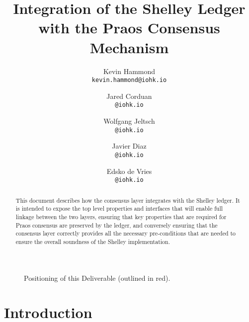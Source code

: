 \documentclass[11pt,a4paper,dvipsnames,twosided,final]{article}
\begin{document}

  \cleardoublepage%
  \tableofcontents%
  \listoffigures%
  \clearpage%

  \begin{changelog}
      \end{changelog}
      \clearpage%
\begin{landscape}
\begin{figure*}
\caption{Positioning of this Deliverable (outlined in red).}
\end{figure*}
\end{landscape}
\pagestyle{empty}
\cleardoublepage


\title{Integration of the Shelley Ledger with the Praos Consensus Mechanism}

\author{Kevin Hammond  \\ {\small \texttt{kevin.hammond@iohk.io}}}
\author{Jared Corduan  \\ {\small \texttt{@iohk.io}}}
\author{Wolfgang Jeltsch  \\ {\small \texttt{@iohk.io}}}
\author{Javier Diaz  \\ {\small \texttt{@iohk.io}}}
\author{Edsko de Vries  \\ {\small \texttt{@iohk.io}}}

\maketitle

\begin{abstract}
  \noindent
  This document describes how the consensus layer integrates with the Shelley ledger.
  It is intended to expose the top level properties and interfaces that will enable
  full linkage between the two layers, ensuring that key properties that are required
  for Praos consensus are preserved by the ledger, and conversely ensuring that the consensus
  layer correctly provides all the necessary pre-conditions that are needed to ensure
  the overall soundness of the Shelley implementation.
\end{abstract}

\thispagestyle{empty}
\clearpage
\pagestyle{myheadings}
\renewcommand{\thepage}{\arabic{page}}
\setcounter{page}{1}
\section{Introduction}
\label{sec:introduction}

\clearpage



\clearpage
\appendix

\end{document}
